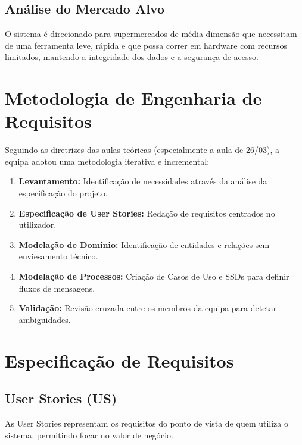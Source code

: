 \documentclass[runningheads,a4paper]{llncs}
\begin{document}
\subsection{Análise do Mercado Alvo}
O sistema é direcionado para supermercados de média dimensão que necessitam de uma ferramenta leve, rápida e que possa correr em hardware com recursos limitados, mantendo a integridade dos dados e a segurança de acesso.

\section{Metodologia de Engenharia de Requisitos}

Seguindo as diretrizes das aulas teóricas (especialmente a aula de 26/03), a equipa adotou uma metodologia iterativa e incremental:

\begin{enumerate}
    \item \textbf{Levantamento:} Identificação de necessidades através da análise da especificação do projeto.
    \item \textbf{Especificação de User Stories:} Redação de requisitos centrados no utilizador.
    \item \textbf{Modelação de Domínio:} Identificação de entidades e relações sem enviesamento técnico.
    \item \textbf{Modelação de Processos:} Criação de Casos de Uso e SSDs para definir fluxos de mensagens.
    \item \textbf{Validação:} Revisão cruzada entre os membros da equipa para detetar ambiguidades.
\end{enumerate}

\newpage

\section{Especificação de Requisitos}

\subsection{User Stories (US)}
As User Stories representam os requisitos do ponto de vista de quem utiliza o sistema, permitindo focar no valor de negócio.
\end{document}
